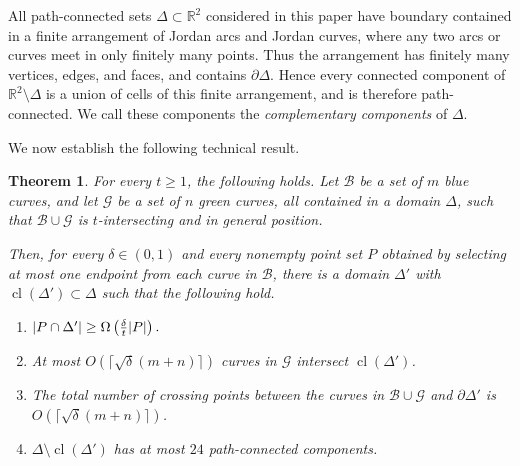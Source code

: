 \documentclass[11pt]{article}
\theoremstyle{plain}
\newtheorem{theorem}{Theorem}[section]
\theoremstyle{definition}
\theoremstyle{remark}
\begin{document}
All path-connected sets \(\Delta\subset\mathbb R^2\) considered in this
paper have boundary contained in a finite arrangement of Jordan arcs and
Jordan curves, where any two arcs or curves meet in only finitely many
points.  Thus the arrangement has finitely many vertices, edges, and faces,
and contains \(\partial\Delta\).  Hence every connected component of
\(\mathbb R^2\setminus\Delta\) is a union of cells of this finite
arrangement, and is therefore path-connected.  We call these components the
\emph{complementary components} of \(\Delta\).






 




We now establish the following technical result.



\begin{theorem}\label{thm:red-blue-region}
For every \(t\ge 1\), the following holds. Let \(\mathcal B\) be a set of
\(m\) blue curves, and let \(\mathcal G\) be a set of \(n\) green curves, all
contained in a domain \(\Delta\), such that \(\mathcal B\cup\mathcal G\) is
\(t\)-intersecting and in general position.

Then, for every \(\delta\in(0,1)\) and every nonempty point set \(P\)
obtained by selecting at most one endpoint from each curve in \(\mathcal B\),
there is a domain $\Delta'$ with \(\operatorname{cl}(\Delta')\subset\Delta\) such that the following hold.
\begin{enumerate}
    \item $|P\cap\Delta'|\ge \Omega\left({\delta\over t}|P|\right).$

    \item At most \(O(\lceil\sqrt\delta(m+n)\rceil)\) curves in \(\mathcal G\) intersect
    \(\operatorname{cl}(\Delta')\).

    \item The total number of crossing points between the curves in
    \(\mathcal B\cup\mathcal G\) and \(\partial\Delta'\) is
    \(O(\lceil\sqrt\delta(m+n)\rceil)\).

    \item \(\Delta\setminus\operatorname{cl}(\Delta')\) has at most \(24\)
    path-connected components.
\end{enumerate}
\end{theorem}
\end{document}
